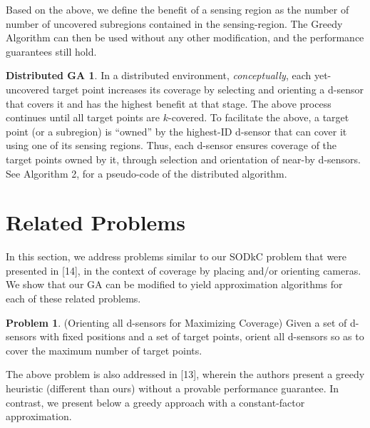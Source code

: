 \documentclass[conference]{IEEEtran}
\theoremstyle{definition}
\newtheorem{problem}{Problem}
\newtheorem*{Distributed_GA}{Distributed GA}
\newtheorem*{NP-Hardness of Approximating the SODkC Problem}{NP-Hardness of Approximating the SODkC Problem}
\newtheorem*{Greedy Algorithm (GA)}{Greedy Algorithm (GA)}
\newtheorem*{GA on the Running Example}{GA on the Running Example}
\newtheorem*{Performance Guarantee of GA}{Performance Guarantee of GA}
\begin{document}
Based on the above, we define the benefit of a sensing region as the number of number of uncovered subregions contained in the sensing-region. The Greedy Algorithm can then be used without any other modification, and the performance guarantees still hold.


\begin{Distributed_GA}
In a distributed environment, \textit{conceptually}, each yet-uncovered target point increases its coverage by selecting and orienting a d-sensor that covers it and has the highest benefit at that stage. The above process continues until all target points are $k$-covered. To facilitate the above, a target point (or a subregion) is “owned” by the highest-ID d-sensor that can cover it using one of its sensing regions. Thus, each d-sensor ensures coverage of the target points owned by it, through selection and orientation of near-by d-sensors. See Algorithm 2, for a pseudo-code of the distributed algorithm.
\end{Distributed_GA}

\section{Related Problems}
In this section, we address problems similar to our SODkC problem that were presented in [14], in the context of coverage by placing and/or orienting cameras. We show that our GA can be modified to yield approximation algorithms for each of these related problems.

\begin{problem}
    (Orienting all d-sensors for Maximizing
Coverage) Given a set of d-sensors with fixed positions
and a set of target points, orient all d-sensors so as to
cover the maximum number of target points.
\end{problem}

The above problem is also addressed in [13], wherein the authors present a greedy heuristic (different than ours) without a provable performance guarantee. In contrast, we present below a greedy approach with a constant-factor approximation.
\end{document}
